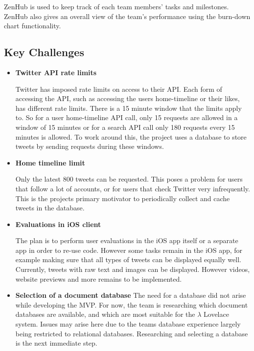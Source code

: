\documentclass{article}
\begin{document}
ZenHub\cite{zenhub} is used to keep track of each team members' tasks and milestones. ZenHub also gives an overall view of the team's performance using the burn-down chart functionality.

\subsection{Key Challenges}
\begin{itemize}
    \item \textbf{Twitter API rate limits}
    
    Twitter has imposed rate limits on access to their API. Each form of accessing the API, such as accessing the users home-timeline or their likes, has different rate limits. There is a 15 minute window that the limits apply to. So for a user home-timeline API call, only 15 requests are allowed in a window of 15 minutes or for a search API call only 180 requests every 15 minutes is allowed. To work around this, the project uses a database to store tweets by sending requests during these windows.
    
    \item \textbf{Home timeline limit}
    
    Only the latest 800 tweets can be requested. This poses a problem for users that follow a lot of accounts, or for users that check Twitter very infrequently. This is the projects primary motivator to periodically collect and cache tweets in the database.
    
    \item \textbf{Evaluations in iOS client}
    
    The plan is to perform user evaluations in the iOS app itself or a separate app in order to re-use code. However some tasks remain in the iOS app, for example making sure that all types of tweets can be displayed equally well. Currently, tweets with raw text and images can be displayed. However videos, website previews and more remains to be implemented.
    
    \item \textbf{Selection of a document database}
    The need for a database did not arise while developing the MVP. For now, the team is researching which document databases are available, and which are most suitable for the $\lambda$ Lovelace system. Issues may arise here due to the teams database experience largely being restricted to relational databases. Researching and selecting a database is the next immediate step.
    
\end{itemize}
\end{document}
